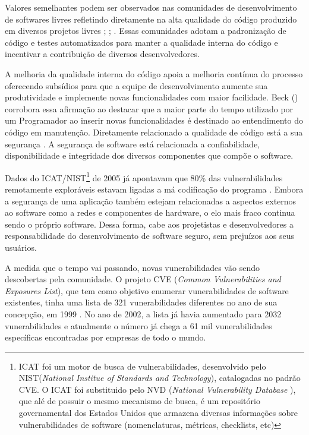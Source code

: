 Valores semelhantes podem ser observados nas comunidades de desenvolvimento de softwares livres refletindo diretamente na alta qualidade do código produzido em diversos projetos livres \cite{schmidt2001}; \cite{halloran2002}; \cite{michlmayr2003}.
%
Essas comunidades adotam a padronização de código e testes automatizados para manter a qualidade interna do código e incentivar a contribuição de diversos desenvolvedores.

A melhoria da qualidade interna do código apoia a melhoria contínua do processo oferecendo subsídios para que a equipe de desenvolvimento aumente sua produtividade e implemente novas funcionalidades com maior facilidade. Beck (\citeyear{beck2007}) corrobora essa afirmação ao destacar que a maior parte do tempo utilizado por um Programador ao inserir novas funcionalidades é destinado ao entendimento do código em manutenção. 
%
Diretamente relacionado a qualidade de código está a sua segurança \cite{tsipenyuk2005}. A segurança de software está relacionada a confiabilidade, disponibilidade e integridade dos diversos componentes que compõe o software.

Dados do ICAT/NIST\footnote{ ICAT foi um motor de busca de vulnerabilidades, desenvolvido pelo NIST(\emph{National Institue of Standards and Technology}), catalogadas no padrão CVE. O ICAT foi substituido pelo NVD (\emph{National Vulnerability Database }), que alé de possuir o mesmo mecanismo de busca, é um repositório governamental dos Estados Unidos que armazena diversas informações sobre vulnerabilidades de software (nomenclaturas, métricas, checklists, etc)} de 2005 já apontavam que 80\% das vulnerabilidades remotamente exploráveis estavam ligadas a má codificação do programa \cite{duarte2005}.
%
Embora a segurança de uma aplicação também estejam relacionadas a aspectos externos ao software como a redes e componentes de hardware, o elo mais fraco continua sendo o próprio software. Dessa forma, cabe aos projetistas e desenvolvedores a responsabilidade do desenvolvimento de software seguro, sem prejuízos aos seus usuários.

%

A medida que o tempo vai passando, novas vunerabilidades vão sendo descobertas pela comunidade. O projeto CVE (\emph{Common Vulnerabilities and Exposures List}), que tem como objetivo enumerar vunerabilidades de software existentes, tinha uma lista de 321 vunerabilidades diferentes no ano de sua concepção, em 1999 \cite{cve2002}.
%
No ano de 2002, a lista já havia aumentado para 2032 vunerabilidades e atualmente o número já chega a 61 mil vunerabilidades específicas encontradas por empresas de todo o mundo.



